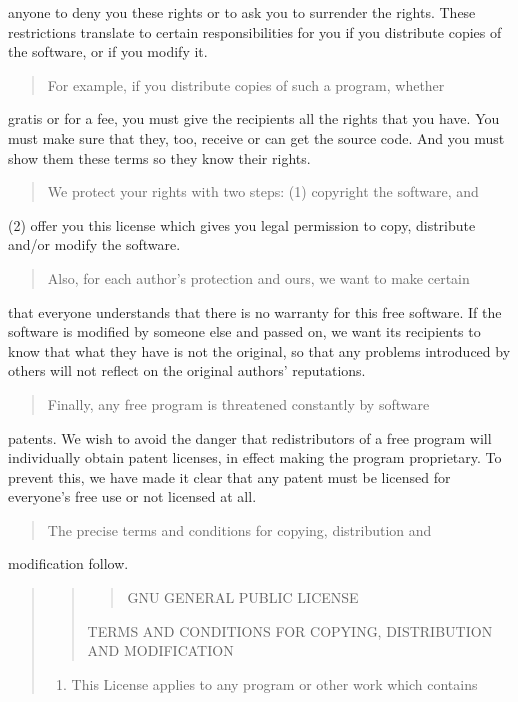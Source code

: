 \documentclass[letterpaper,10pt,english]{sphinxmanual}
\begin{document}
anyone to deny you these rights or to ask you to surrender the rights.
These restrictions translate to certain responsibilities for you if you
distribute copies of the software, or if you modify it.
\begin{quote}

For example, if you distribute copies of such a program, whether
\end{quote}

gratis or for a fee, you must give the recipients all the rights that
you have.  You must make sure that they, too, receive or can get the
source code.  And you must show them these terms so they know their
rights.
\begin{quote}

We protect your rights with two steps: (1) copyright the software, and
\end{quote}

(2) offer you this license which gives you legal permission to copy,
distribute and/or modify the software.
\begin{quote}

Also, for each author’s protection and ours, we want to make certain
\end{quote}

that everyone understands that there is no warranty for this free
software.  If the software is modified by someone else and passed on, we
want its recipients to know that what they have is not the original, so
that any problems introduced by others will not reflect on the original
authors’ reputations.
\begin{quote}

Finally, any free program is threatened constantly by software
\end{quote}

patents.  We wish to avoid the danger that redistributors of a free
program will individually obtain patent licenses, in effect making the
program proprietary.  To prevent this, we have made it clear that any
patent must be licensed for everyone’s free use or not licensed at all.
\begin{quote}

The precise terms and conditions for copying, distribution and
\end{quote}

modification follow.
\begin{quote}
\begin{quote}
\begin{quote}

GNU GENERAL PUBLIC LICENSE
\end{quote}

TERMS AND CONDITIONS FOR COPYING, DISTRIBUTION AND MODIFICATION
\end{quote}
\begin{enumerate}
%
\setcounter{enumi}{-1}
\item {} 
This License applies to any program or other work which contains

\end{enumerate}
\end{quote}
\end{document}
